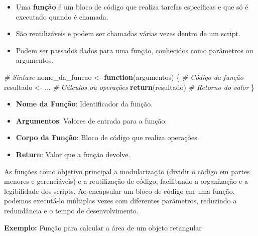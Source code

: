 \documentclass[
]{book}
\newenvironment{Shaded}{\begin{snugshade}}{\end{snugshade}}
\newcommand{\CommentTok}[1]{\textcolor[rgb]{0.56,0.35,0.01}{\textit{#1}}}
\newcommand{\ControlFlowTok}[1]{\textcolor[rgb]{0.13,0.29,0.53}{\textbf{#1}}}
\newcommand{\FunctionTok}[1]{\textcolor[rgb]{0.13,0.29,0.53}{\textbf{#1}}}
\newcommand{\NormalTok}[1]{#1}
\newcommand{\OtherTok}[1]{\textcolor[rgb]{0.56,0.35,0.01}{#1}}
\begin{document}
\begin{itemize}
\item
  Uma \textbf{função} é um bloco de código que realiza tarefas específicas e que só é executado quando é chamada.
\item
  São reutilizáveis e podem ser chamadas várias vezes dentro de um script.
\item
  Podem ser passados dados para uma função, conhecidos como parâmetros ou argumentos.
\end{itemize}

\begin{Shaded}
\begin{Highlighting}[]
\CommentTok{\# Sintaxe}
\NormalTok{nome\_da\_funcao }\OtherTok{\textless{}{-}} \ControlFlowTok{function}\NormalTok{(argumentos) \{}
  \CommentTok{\# Código da função}
\NormalTok{  resultado }\OtherTok{\textless{}{-}}\NormalTok{ ... }\CommentTok{\# Cálculos ou operações}
  \FunctionTok{return}\NormalTok{(resultado) }\CommentTok{\# Retorno do valor}
\NormalTok{\}}
\end{Highlighting}
\end{Shaded}

\begin{itemize}
\item
  \textbf{Nome da Função}: Identificador da função.
\item
  \textbf{Argumentos}: Valores de entrada para a função.
\item
  \textbf{Corpo da Função}: Bloco de código que realiza operações.
\item
  \textbf{Return}: Valor que a função devolve.
\end{itemize}

As funções como objetivo principal a modularização (dividir o código em partes menores e gerenciáveis) e a reutilização de código, facilitando a organização e a legibilidade dos scripts. Ao encapsular um bloco de código em uma função, podemos executá-lo múltiplas vezes com diferentes parâmetros, reduzindo a redundância e o tempo de desenvolvimento.

\textbf{Exemplo:} Função para calcular a área de um objeto retangular
\end{document}

